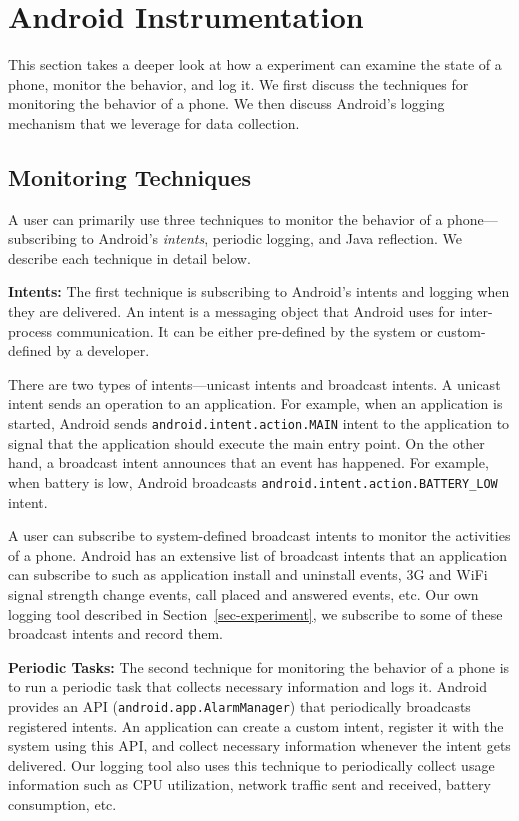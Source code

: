 \section{Android Instrumentation}
\label{sec-logging}

This section takes a deeper look at how a \PhoneLab{} experiment can examine the
state of a phone, monitor the behavior, and log it. We first discuss the
techniques for monitoring the behavior of a phone. We then discuss Android's
logging mechanism that we leverage for data collection.

\subsection{Monitoring Techniques}

A \PhoneLab{} user can primarily use three techniques to monitor the behavior of
a phone---subscribing to Android's {\it intents}, periodic logging, and Java
reflection. We describe each technique in detail below.

{\bf Intents:} The first technique is subscribing to Android's intents and
logging when they are delivered. An intent is a messaging object that Android
uses for inter-process communication. It can be either pre-defined by the system
or custom-defined by a developer.

There are two types of intents---unicast intents and broadcast intents. A
unicast intent sends an operation to an application. For example, when an
application is started, Android sends \texttt{android.intent.action.MAIN} intent
to the application to signal that the application should execute the main entry
point. On the other hand, a broadcast intent announces that an event has
happened. For example, when battery is low, Android broadcasts
\texttt{android.intent.action.BATTERY\_LOW} intent.

A \PhoneLab{} user can subscribe to system-defined broadcast intents to monitor
the activities of a phone. Android has an extensive list of broadcast intents
that an application can subscribe to such as application install and uninstall
events, 3G and WiFi signal strength change events, call placed and answered
events, etc. Our own logging tool described in Section~\ref{sec-experiment}, we
subscribe to some of these broadcast intents and record them.

{\bf Periodic Tasks:} The second technique for monitoring the behavior of a
phone is to run a periodic task that collects necessary information and logs it.
Android provides an API (\texttt{android.app.AlarmManager}) that periodically
broadcasts registered intents. An application can create a custom intent,
register it with the system using this API, and collect necessary information
whenever the intent gets delivered. Our logging tool also uses this technique to
periodically collect usage information such as CPU utilization, network traffic
sent and received, battery consumption, etc.

